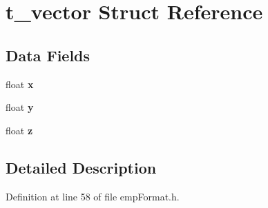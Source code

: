 \hypertarget{structt__vector}{}\section{t\+\_\+vector Struct Reference}
\label{structt__vector}
\subsection*{Data Fields}
\begin{DoxyCompactItemize}
\item 
float {\bfseries x}\hypertarget{structt__vector_a5b21f4038362a020a0cec5c385c2094e}{}\label{structt__vector_a5b21f4038362a020a0cec5c385c2094e}

\item 
float {\bfseries y}\hypertarget{structt__vector_ab295b1895cc54ebe15ed2100d46dff21}{}\label{structt__vector_ab295b1895cc54ebe15ed2100d46dff21}

\item 
float {\bfseries z}\hypertarget{structt__vector_a9dbf9df2e3f698a0cfa30d9a7b77c7b7}{}\label{structt__vector_a9dbf9df2e3f698a0cfa30d9a7b77c7b7}

\end{DoxyCompactItemize}


\subsection{Detailed Description}


Definition at line 58 of file emp\+Format.\+h.

